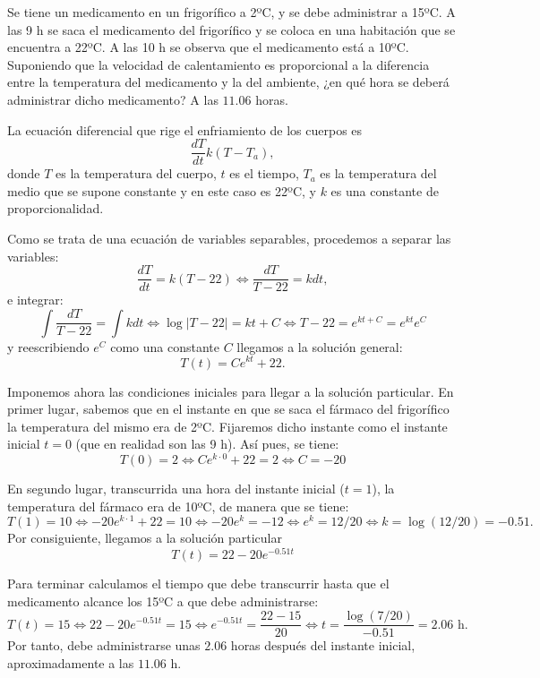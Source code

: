 {Se tiene un medicamento en un frigorífico a 2ºC, y se debe administrar a 15ºC. A las 9 h se saca el medicamento del
frigorífico y se coloca en una habitación que se encuentra a 22ºC. A las 10 h se observa que el medicamento está a
10ºC. Suponiendo que la velocidad de calentamiento es proporcional a la diferencia entre la temperatura del medicamento
y la del ambiente, ¿en qué hora se deberá administrar dicho medicamento?}
{A las $11.06$ horas.
}
{La ecuación diferencial que rige el enfriamiento de los cuerpos es
\[
\frac{dT}{dt}k(T-T_a),
\]
donde $T$ es la temperatura del cuerpo, $t$ es el tiempo, $T_a$ es la
temperatura del medio que se supone constante y en este caso es 22ºC, y $k$ es
una constante de proporcionalidad.

Como se trata de una ecuación de variables separables, procedemos a separar las
variables:
\[
\frac{dT}{dt}=k(T-22) \Leftrightarrow \frac{dT}{T-22}=kdt,
\]
e integrar:
\[
\int \frac{dT}{T-22}=\int kdt \Leftrightarrow \log|T-22|=kt+C \Leftrightarrow
T-22 = e^{kt+C}=e^{kt}e^C
\]
y reescribiendo $e^C$ como una constante $C$ llegamos a la solución general:
\[T(t)=Ce^{kt}+22.\]

Imponemos ahora las condiciones iniciales para llegar a la solución particular.
En primer lugar, sabemos que en el instante en que se saca el fármaco
del frigorífico la temperatura del mismo era de 2ºC. Fijaremos dicho instante
como el instante inicial $t=0$ (que en realidad son las 9 h). Así pues, se
tiene:
\[
T(0)=2 \Leftrightarrow Ce^{k\cdot 0}+22 = 2 \Leftrightarrow C = -20
\]

En segundo lugar, transcurrida una hora del instante inicial ($t=1$), la
temperatura del fármaco era de 10ºC, de manera que se tiene:
\[
T(1)=10 \Leftrightarrow -20e^{k\cdot 1}+22 =10 \Leftrightarrow -20e^k = -12
\Leftrightarrow e^k = 12/20 \Leftrightarrow k=\log (12/20)=-0.51.
\]
Por consiguiente, llegamos a la solución particular
\[
T(t)= 22-20e^{-0.51t}
\]

Para terminar calculamos el tiempo que debe transcurrir hasta que el medicamento
alcance los 15ºC a que debe administrarse:
\[
T(t)=15 \Leftrightarrow 22-20e^{-0.51t}=15 \Leftrightarrow
e^{-0.51t}=\frac{22-15}{20} \Leftrightarrow t=\frac{\log(7/20)}{-0.51}=2.06
\mbox{ h}.
\]
Por tanto, debe administrarse unas $2.06$ horas después del instante inicial,
aproximadamente a las $11.06$ h.
}


